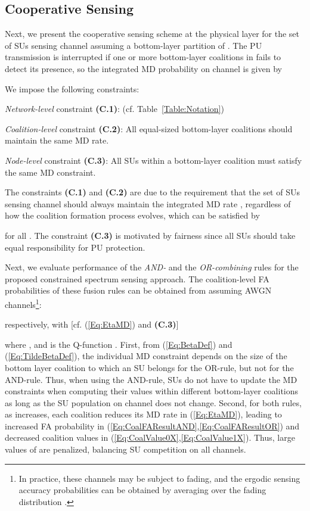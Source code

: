 \documentclass[journal,draftclsnofoot,onecolumn]{IEEEtran}
\theoremstyle{definition}
\begin{document}
\subsection{Cooperative Sensing}\label{subsec:CoopSenseDef}
Next, we present the cooperative sensing scheme at the physical layer for the set of SUs  sensing channel  assuming a bottom-layer partition  of . The PU transmission is interrupted if one or more bottom-layer coalitions in  fails to detect its presence, so the integrated MD probability on channel  is given by

We impose the following constraints:

\noindent \emph{Network-level} constraint \textbf{(C.1)}:  (cf. Table~\ref{Table:Notation})

\noindent \emph{Coalition-level} constraint \textbf{(C.2)}: All equal-sized bottom-layer coalitions should maintain the same MD rate.

\noindent \emph{Node-level} constraint \textbf{(C.3)}: All SUs within a bottom-layer coalition must satisfy the same MD constraint\cite{RLiuEvoGame,YCLiangWCNC}.

The constraints \textbf{(C.1)} and \textbf{(C.2)} are due to the requirement that the set of SUs  sensing channel  should always maintain the integrated MD rate , regardless of how the coalition formation process evolves, which can be satisfied by

for all . The constraint \textbf{(C.3)} is motivated by fairness since all SUs should take equal responsibility for PU protection.

Next, we evaluate performance of the \emph{AND-} and the \emph{OR-combining} rules for the proposed constrained spectrum sensing approach. The coalition-level FA probabilities of these fusion rules can be obtained from \cite[eq.~(10--17)]{YCLiangWCNC} assuming AWGN channels\footnote{In practice, these channels may be subject to fading, and the ergodic sensing accuracy probabilities can be obtained by averaging over the fading distribution \cite{CoopSense,MultiChCoalSenseGame,ZHanCoalSenseGame}.}:

respectively, with [cf. (\ref{Eq:EtaMD}) and \textbf{(C.3)}]

where , and  is the Q-function \cite[eq. (B.20)]{GoldsmithWireless}. First, from (\ref{Eq:BetaDef}) and (\ref{Eq:TildeBetaDef}), the individual MD constraint  depends on the size of the bottom layer coalition to which an SU belongs for the OR-rule, but not for the AND-rule. Thus, when using the AND-rule, SUs do not have to update the MD constraints when computing their values within different bottom-layer coalitions as long as the SU population  on channel  does not change. Second, for both rules, as  increases, each coalition  reduces its MD rate  in (\ref{Eq:EtaMD}), leading to increased FA probability  in (\ref{Eq:CoalFAResultAND},\ref{Eq:CoalFAResultOR}) and decreased coalition values in (\ref{Eq:CoalValue0X},\ref{Eq:CoalValue1X}). Thus, large values of  are penalized, balancing SU competition on all channels. 
\end{document}
